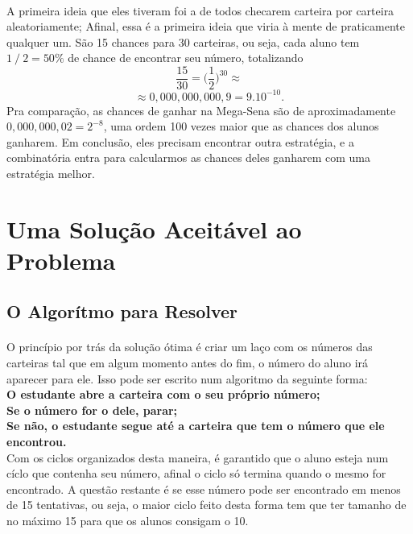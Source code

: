 \documentclass{article}
\begin{document}
        \paragraph{}A primeira ideia que eles tiveram foi a de todos checarem carteira por carteira aleatoriamente; Afinal, essa \'e a primeira ideia que viria \`a mente 
        de praticamente qualquer um. S\~ao 15 chances para 30 carteiras, ou seja, cada aluno tem $1 \fracslash 2 = 50\%$ de chance de encontrar seu n\'umero, totalizando  
        $$
            \frac{15}{30} = \biggl(\frac{1}{2}\biggr)^{30} \approx 
        $$
        $$
            \approx 0,000,000,000,9 = 9.10^{-10}.
        $$
        Pra compara\c c\~ao, as chances de ganhar na Mega-Sena s\~ao de aproximadamente $0,000,000,02 = 2^{-8}$, uma ordem 100 vezes maior que as chances dos alunos ganharem.
        Em conclus\~ao, eles precisam encontrar outra estrat\'egia, e a combinat\'oria entra para calcularmos as chances deles ganharem com uma estrat\'egia melhor.

    \section{Uma Solu\c c\~ao Aceit\'avel ao Problema}
    \subsection{O Algor\'itmo para Resolver}
        \paragraph{}O princ\'ipio por tr\'as da solu\c c\~ao \'otima \'e criar um la\c co com os n\'umeros das carteiras tal que em algum momento antes do fim, 
        o n\'umero do aluno ir\'a aparecer para ele. Isso pode ser escrito num algoritmo da seguinte forma: \\
        \textbf{O estudante abre a carteira com o seu pr\'oprio n\'umero;}\\
        \textbf{Se o n\'umero for o dele, parar;}\\
        \textbf{Se n\~ao, o estudante segue at\'e a carteira que tem o n\'umero que ele encontrou.}\\
        Com os ciclos organizados desta maneira, \'e garantido que o aluno esteja num c\'iclo que contenha seu n\'umero, afinal o ciclo s\'o termina quando o mesmo for
        encontrado. A quest\~ao restante \'e se esse n\'umero pode ser encontrado em menos de 15 tentativas, ou seja, o maior ciclo feito desta forma tem que ter 
        tamanho de no m\'aximo 15 para que os alunos consigam o 10. 
\end{document}
